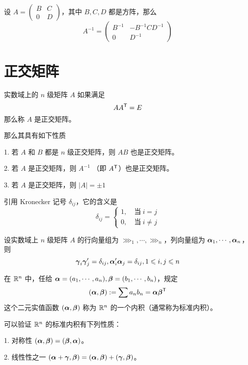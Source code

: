 \begin{theorem}
    设 $A = \left(\begin{matrix} B & C\\ 0 & D \end{matrix}\right)$，其中 $B,C,D$ 都是方阵，那么
    $$A^{-1} = \left(\begin{matrix} B^{-1} & -B^{-1}CD^{-1}\\ 0 & D^{-1} \end{matrix}\right)$$
\end{theorem}

\section{正交矩阵}

\begin{definition}
    实数域上的 $n$ 级矩阵 $A$ 如果满足
    $$A{A}^\mathsf{T}=E$$
    那么称 $A$ 是正交矩阵。
\end{definition}

那么其具有如下性质

1. 若 $A$ 和  $B$ 都是 $n$ 级正交矩阵，则 $AB$ 也是正交矩阵。

2. 若 $A$ 是正交矩阵，则 $A^{-1}$ （即 ${A}^\mathsf{T}$）也是正交矩阵。

3. 若 $A$ 是正交矩阵，则 $|A|=\pm 1$


引用 Kronecker 记号 $\delta_{ij}$，它的含义是
$$\delta_{ij}=\begin{cases}
    1,\quad \text{当}\ i=j\\
    0,\quad \text{当}\ i\ne j
\end{cases}$$

\begin{theorem}
    设实数域上 $n$ 级矩阵 $A$ 的行向量组为 $\ggg_1,\cdots,\ggg_n$，列向量组为 $\boldsymbol{\alpha}_1,\cdots,\boldsymbol{\alpha}_n$，则
    $$\boldsymbol{\gamma}_i\boldsymbol{\gamma}_j'=\delta_{ij},\boldsymbol{\alpha}_i'\boldsymbol{\alpha}_j=\delta_{ij},1 \leqslant i,j \leqslant n$$
\end{theorem}

\begin{definition}
    在 $\mathbb{R}^n$ 中，任给 $\boldsymbol{\alpha} = (a_1,\cdots,a_n),\boldsymbol{\beta}=(b_1,\cdots,b_n)$，规定
    $$(\boldsymbol{\alpha},\boldsymbol{\beta}) := \sum a_nb_n = \boldsymbol{\alpha}{\boldsymbol{\beta}}^\mathsf{T}$$
    这个二元实值函数 $(\boldsymbol{\alpha},\boldsymbol{\beta})$ 称为 $\mathbb{R}^n$ 的一个内积（通常称为标准内积）。
\end{definition}

可以验证 $\mathbb{R}^n$ 的标准内积有下列性质：

1. 对称性 $(\boldsymbol{\alpha},\boldsymbol{\beta}) = (\boldsymbol{\beta},\boldsymbol{\alpha})$。

2. 线性性之一 $(\boldsymbol{\alpha}+\boldsymbol{\gamma},\boldsymbol{\beta}) = (\boldsymbol{\alpha},\boldsymbol{\beta}) + (\boldsymbol{\gamma},\boldsymbol{\beta})$。

